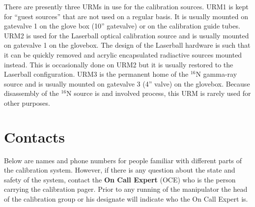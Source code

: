   There are presently three URMs in use for the calibration sources.
URM1 is kept for ``guest sources'' that are not used on a regular basis.
It is usually mounted on gatevalve 1 on the glove box (10'' gatevalve)
or on the calibration guide tubes.  URM2 is used for the Laserball
optical calibration source and is usually mounted on gatevalve 1 on
the glovebox.  The design of the Laserball hardware is such that
it can be quickly removed and acrylic encapsulated radiactive sources
mounted instead.  This is occasionally done on URM2 but it is usually
restored to the Laserball configuration.  URM3 is the permanent home
of the  $^{16}$N gamma-ray source and is usually mounted on gatevalve
3 (4'' valve) on the glovebox.  Because disassembly of the $^{16}$N
source is and involved process, this URM is rarely used for other
purposes.



\newpage
\section{Contacts}

Below are names and phone numbers for people familiar with different
parts of the calibration system.  However, if there is any question
about the state and safety of the system, contact the {\bf On Call Expert}
(OCE)
who is the person carrying the calibration pager.  Prior to any running
of the manipulator the head of the calibration group or his designate will
indicate who the On Call Expert is.

